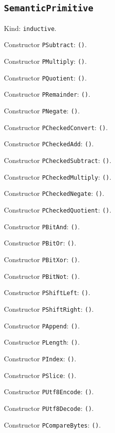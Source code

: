 \documentclass[11pt]{article}
\begin{document}
\subsection*{\texttt{SemanticPrimitive}}
\noindent Kind: \texttt{inductive}.\par
\noindent Constructor \texttt{PSubtract}: \texttt{()}.\par
\noindent Constructor \texttt{PMultiply}: \texttt{()}.\par
\noindent Constructor \texttt{PQuotient}: \texttt{()}.\par
\noindent Constructor \texttt{PRemainder}: \texttt{()}.\par
\noindent Constructor \texttt{PNegate}: \texttt{()}.\par
\noindent Constructor \texttt{PCheckedConvert}: \texttt{()}.\par
\noindent Constructor \texttt{PCheckedAdd}: \texttt{()}.\par
\noindent Constructor \texttt{PCheckedSubtract}: \texttt{()}.\par
\noindent Constructor \texttt{PCheckedMultiply}: \texttt{()}.\par
\noindent Constructor \texttt{PCheckedNegate}: \texttt{()}.\par
\noindent Constructor \texttt{PCheckedQuotient}: \texttt{()}.\par
\noindent Constructor \texttt{PBitAnd}: \texttt{()}.\par
\noindent Constructor \texttt{PBitOr}: \texttt{()}.\par
\noindent Constructor \texttt{PBitXor}: \texttt{()}.\par
\noindent Constructor \texttt{PBitNot}: \texttt{()}.\par
\noindent Constructor \texttt{PShiftLeft}: \texttt{()}.\par
\noindent Constructor \texttt{PShiftRight}: \texttt{()}.\par
\noindent Constructor \texttt{PAppend}: \texttt{()}.\par
\noindent Constructor \texttt{PLength}: \texttt{()}.\par
\noindent Constructor \texttt{PIndex}: \texttt{()}.\par
\noindent Constructor \texttt{PSlice}: \texttt{()}.\par
\noindent Constructor \texttt{PUtf8Encode}: \texttt{()}.\par
\noindent Constructor \texttt{PUtf8Decode}: \texttt{()}.\par
\noindent Constructor \texttt{PCompareBytes}: \texttt{()}.\par
\end{document}
